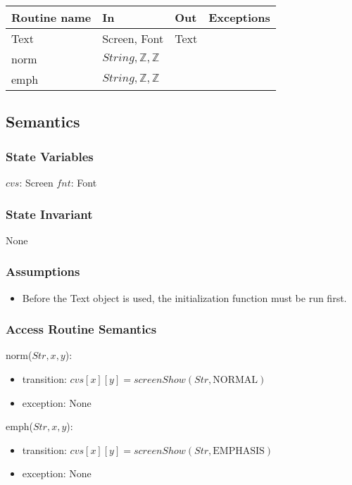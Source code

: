 \documentclass[12pt]{article}
\begin{document}
\begin{tabular}{| l | l | l | l |}
\hline
\textbf{Routine name} & \textbf{In} & \textbf{Out} & \textbf{Exceptions}\\
\hline
Text & Screen, Font & Text & ~\\
\hline
norm & $String, \mathbb{Z}, \mathbb{Z}$ &  & ~\\
\hline
emph & $String, \mathbb{Z}, \mathbb{Z}$ &  & ~\\
\hline
\end{tabular}

\subsection*{Semantics}

\subsubsection*{State Variables}

$cvs$: Screen %
$fnt$: Font %

\subsubsection*{State Invariant}

None

\subsubsection*{Assumptions}

\begin{itemize}
  \item Before the Text object is used, the initialization function must be run first.
\end{itemize}

\subsubsection*{Access Routine Semantics}

norm($Str,x,y$):
\begin{itemize}
    \item transition: $cvs[x][y]=screenShow(Str,\mbox{NORMAL})$
    \item exception: None
\end{itemize}

emph($Str,x,y$):
\begin{itemize}
    \item transition: $cvs[x][y]=screenShow(Str,\mbox{EMPHASIS})$
    \item exception: None
\end{itemize}
\end{document}
